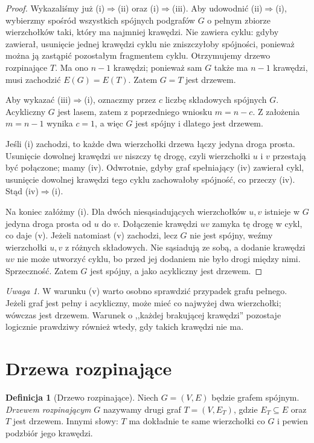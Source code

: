 \documentclass[11pt,a4paper]{report}
\numberwithin{equation}{section}
\theoremstyle{plain}
\theoremstyle{definition}
\newtheorem{definicja}[twierdzenie]{Definicja}
\theoremstyle{remark}
\newtheorem{uwaga}[twierdzenie]{Uwaga}
\begin{document}
\begin{proof}
Wykazaliśmy już (i)$\Rightarrow$(ii) oraz
(i)$\Rightarrow$(iii). Aby udowodnić
(ii)$\Rightarrow$(i), wybierzmy spośród wszystkich
spójnych podgrafów $G$ o pełnym zbiorze
wierzchołków taki, który ma najmniej krawędzi.
Nie zawiera cyklu: gdyby zawierał, usunięcie
jednej krawędzi cyklu nie zniszczyłoby spójności,
ponieważ można ją zastąpić pozostałym fragmentem
cyklu. Otrzymujemy drzewo rozpinające $T$.
Ma ono $n-1$ krawędzi; ponieważ sam $G$ także
ma $n-1$ krawędzi, musi zachodzić $E(G)=E(T)$.
Zatem $G=T$ jest drzewem.

Aby wykazać (iii)$\Rightarrow$(i), oznaczmy
przez $c$ liczbę składowych spójnych $G$.
Acykliczny $G$ jest lasem, zatem z poprzedniego
wniosku $m=n-c$. Z założenia $m=n-1$ wynika
$c=1$, a więc $G$ jest spójny i dlatego jest
drzewem.

Jeśli (i) zachodzi, to każde dwa wierzchołki
drzewa łączy jedyna droga prosta. Usunięcie
dowolnej krawędzi $uv$ niszczy tę drogę, czyli
wierzchołki $u$ i $v$ przestają być połączone;
mamy (iv). Odwrotnie, gdyby graf spełniający
(iv) zawierał cykl, usunięcie dowolnej krawędzi
tego cyklu zachowałoby spójność, co przeczy (iv).
Stąd (iv)$\Rightarrow$(i).

Na koniec załóżmy (i). Dla dwóch niesąsiadujących
wierzchołków $u,v$ istnieje w $G$ jedyna droga
prosta od $u$ do $v$. Dołączenie krawędzi $uv$
zamyka tę drogę w cykl, co daje (v).
Jeżeli natomiast (v) zachodzi, lecz $G$ nie
jest spójny, weźmy wierzchołki $u,v$ z różnych
składowych. Nie sąsiadują ze sobą, a dodanie
krawędzi $uv$ nie może utworzyć cyklu, bo
przed jej dodaniem nie było drogi między nimi.
Sprzeczność. Zatem $G$ jest spójny, a jako
acykliczny jest drzewem.
\end{proof}

\begin{uwaga}
W warunku (v) warto osobno sprawdzić przypadek grafu
pełnego. Jeżeli graf jest pełny i acykliczny,
może mieć co najwyżej dwa wierzchołki; wówczas
jest drzewem. Warunek o ,,każdej brakującej krawędzi''
pozostaje logicznie prawdziwy również wtedy, gdy
takich krawędzi nie ma.
\end{uwaga}

\section{Drzewa rozpinające}
\label{sec:tg-rozpinajace}

\begin{definicja}[Drzewo rozpinające]
Niech $G=(V,E)$ będzie grafem spójnym.
\emph{Drzewem rozpinającym} $G$ nazywamy
drugi graf $T=(V,E_T)$, gdzie $E_T\subseteq E$
oraz $T$ jest drzewem. Innymi słowy:
$T$ ma dokładnie te same wierzchołki co $G$
i pewien podzbiór jego krawędzi.
\end{definicja}
\end{document}
